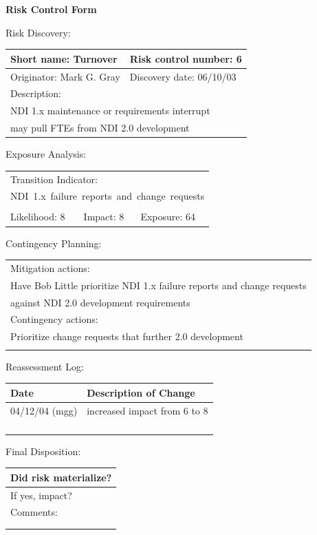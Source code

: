 \documentclass{article}
\begin{document}
\begin{center}\Large\bf
Risk Control Form
\end{center}
\vspace{24pt}

Risk Discovery:

\begin{tabular}{|p{211pt}|p{211pt}|} \hline
Short name: Turnover & Risk control number: 6\\ \hline
Originator: Mark G. Gray & Discovery date: 06/10/03\\ \hline
\multicolumn{2}{|l|}{Description:} \\
\multicolumn{2}{|l|}{NDI 1.x maintenance or requirements interrupt} \\
\multicolumn{2}{|l|}{may pull FTEs from NDI 2.0 development} \\ \hline
\end{tabular}
\vspace{24pt}

Exposure Analysis:

\begin{tabular}{|p{138pt}|p{138pt}|p{138pt}|} \hline
\multicolumn{3}{|l|}{Transition Indicator:} \\
\multicolumn{3}{|l|}{\mbox{NDI 1.x failure reports and change requests}} \\
\multicolumn{3}{|l|}{\mbox{}} \\ \hline
Likelihood: 8 & Impact: 8 & Exposure: 64\\ \hline
\end{tabular}
\vspace{24pt}

Contingency Planning:

\begin{tabular}{|p{433pt}|} \hline
Mitigation actions: \\
Have Bob Little prioritize NDI 1.x failure reports and change requests \\
against NDI 2.0 development requirements \\ \hline
Contingency actions: \\
Prioritize change requests that further 2.0 development \\
\mbox{} \\ \hline
\end{tabular}
\vspace{24pt}

Reassessment Log:

\begin{tabular}{|p{72pt}|p{351pt}|} \hline
Date & Description of Change \\ \hline
04/12/04 (mgg) & increased impact from 6 to 8 \\ \hline
\mbox{} & \mbox{} \\ \hline
\mbox{} & \mbox{} \\ \hline
\mbox{} & \mbox{} \\ \hline
\mbox{} & \mbox{} \\ \hline
\end{tabular}
\vspace{24pt}

Final Disposition:

\begin{tabular}{|p{433pt}|} \hline
Did risk materialize? \\ \hline
If yes, impact? \\ \hline
Comments: \\
\mbox{} \\
\mbox{} \\ \hline
\end{tabular}
\end{document}
